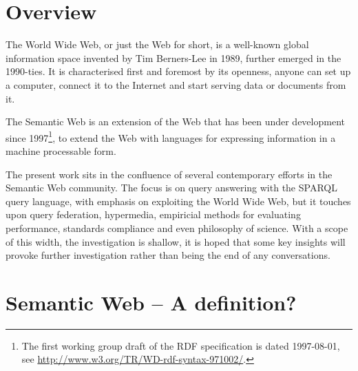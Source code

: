 \section{Overview}\label{sec:introoverview}

The World Wide Web, or just the Web for short, is a well-known global
information space invented by Tim Berners-Lee in 1989, further emerged
in the 1990-ties. It is characterised first and foremost by its
openness, anyone can set up a computer, connect it to the Internet and
start serving data or documents from it. 

The Semantic Web is an extension of the Web that has been under
development since 1997\footnote{The first working group draft of the
  RDF specification is dated 1997-08-01, see
  \url{http://www.w3.org/TR/WD-rdf-syntax-971002/}.}, to extend the
Web with languages for expressing information in a machine processable
form\cite{semwebroadmap}.



The present work sits in the confluence of several contemporary
efforts in the Semantic Web community. The focus is on query answering
with the SPARQL query language, with emphasis on exploiting the World
Wide Web, but it touches upon query federation, hypermedia, empiricial
methods for evaluating performance, standards compliance and even
philosophy of science. With a scope of this width, the investigation
is shallow, it is hoped that some key insights will provoke further
investigation rather than being the end of any conversations.

\section{Semantic Web -- A definition?}\label{sec:noref}

